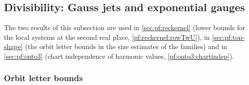 \subsection{Divisibility: Gauss jets and exponential gauges}\label{sec:pf:sh-curv:div}

The two results of this subsection are used in \cref{sec:pf:reckernel} (lower bounds for the local systems at the second
real place, \cref{pf:reckernel:rowTwU}), in \cref{sec:pf:top-shape} (the orbit letter bounds in the size estimates of the
families) and in \cref{sec:pf:onto3} (chart independence of harmonic values, \cref{pf:onto3:chartindep}).

\subsubsection{Orbit letter bounds}

